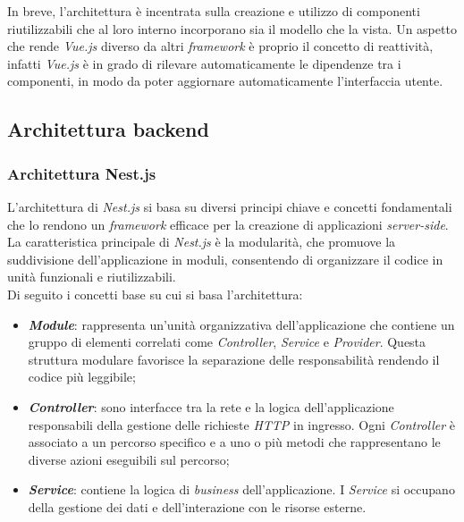 In breve, l'architettura è incentrata sulla creazione e utilizzo di componenti riutilizzabili che al loro interno incorporano sia il modello che la vista. Un aspetto che rende \textit{Vue.js}
diverso da altri \textit{framework} è proprio il concetto di reattività, infatti \textit{Vue.js} è in grado di rilevare automaticamente le dipendenze tra i componenti, in modo da poter aggiornare automaticamente l'interfaccia utente.

\subsection{Architettura backend}\label{subsec:architettura-backend}
\subsubsection{Architettura Nest.js}\label{subsubsec:architettura-nest.js}
L'architettura di \textit{Nest.js} si basa su diversi principi chiave e concetti fondamentali che lo rendono un \textit{framework} efficace per la creazione di applicazioni \textit{server-side}.
La caratteristica principale di \textit{Nest.js} è la modularità, che promuove la suddivisione dell'applicazione in moduli, consentendo di organizzare il codice in unità funzionali e riutilizzabili.\\
Di seguito i concetti base su cui si basa l'architettura:
\begin{itemize}
  \item \textbf{\textit{Module}}: rappresenta un'unità organizzativa dell'applicazione che contiene un gruppo di elementi correlati come \textit{Controller}, \textit{Service} e \textit{Provider}. Questa struttura modulare 
  favorisce la separazione delle responsabilità rendendo il codice più leggibile;
  \item \textbf{\textit{Controller}}: sono interfacce tra la rete e la logica dell'applicazione responsabili della gestione delle richieste \textit{HTTP} in ingresso. Ogni \textit{Controller} è associato a un percorso specifico e a uno o più metodi che rappresentano le diverse azioni eseguibili sul percorso;
  \item \textbf{\textit{Service}}: contiene la logica di \textit{business} dell'applicazione. I \textit{Service} si occupano della gestione dei dati e dell'interazione con le risorse esterne.
\end{itemize}